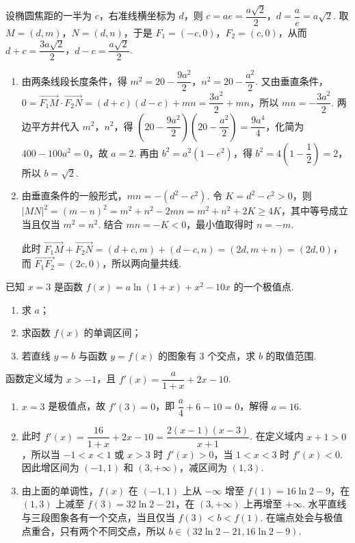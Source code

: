 \begin{solution}
设椭圆焦距的一半为 \(c\)，右准线横坐标为 \(d\)，则 \(c=ae=\dfrac{a\sqrt2}{2}\)，\(d=\dfrac ae=a\sqrt2\). 取 \(M=(d,m)\)，\(N=(d,n)\)，于是 \(F_1=(-c,0)\)，\(F_2=(c,0)\)，从而 \(d+c=\dfrac{3a\sqrt2}{2}\)，\(d-c=\dfrac{a\sqrt2}{2}\).

\begin{enumerate}
\item 由两条线段长度条件，得 \(m^2=20-\dfrac{9a^2}{2}\)，\(n^2=20-\dfrac{a^2}{2}\). 又由垂直条件，
\(0=\overrightarrow{F_1M}\cdot\overrightarrow{F_2N}=(d+c)(d-c)+mn=\dfrac{3a^2}{2}+mn\)，所以 \(mn=-\dfrac{3a^2}{2}\). 两边平方并代入 \(m^2\)，\(n^2\)，得
\(\left(20-\dfrac{9a^2}{2}\right)\left(20-\dfrac{a^2}{2}\right)=\dfrac{9a^4}{4}\)，化简为 \(400-100a^2=0\)，故 \(a=2\). 再由 \(b^2=a^2(1-e^2)\)，得 \(b^2=4\left(1-\dfrac12\right)=2\)，所以 \(b=\sqrt2\).
\item 由垂直条件的一般形式，\(mn=-(d^2-c^2)\). 令 \(K=d^2-c^2>0\)，则
\(\lvert MN\rvert^2=(m-n)^2=m^2+n^2-2mn=m^2+n^2+2K\geqslant4K\)，其中等号成立当且仅当 \(m^2=n^2\). 结合 \(mn=-K<0\)，最小值取得时 \(n=-m\).

此时 \(\overrightarrow{F_1M}+\overrightarrow{F_2N}=(d+c,m)+(d-c,n)=(2d,m+n)=(2d,0)\)，而 \(\overrightarrow{F_1F_2}=(2c,0)\)，所以两向量共线.
\end{enumerate}
\end{solution}

\begin{problem}
已知 \(x=3\) 是函数 \(f(x)=a\ln(1+x)+x^2-10x\) 的一个极值点.

\begin{enumerate}
\item 求 \(a\)；
\item 求函数 \(f(x)\) 的单调区间；
\item 若直线 \(y=b\) 与函数 \(y=f(x)\) 的图象有 \(3\) 个交点，求 \(b\) 的取值范围.
\end{enumerate}
\end{problem}

\begin{solution}
函数定义域为 \(x>-1\)，且 \(f'(x)=\dfrac{a}{1+x}+2x-10\).

\begin{enumerate}
\item \(x=3\) 是极值点，故 \(f'(3)=0\)，即 \(\dfrac a4+6-10=0\)，解得 \(a=16\).
\item 此时 \(f'(x)=\dfrac{16}{1+x}+2x-10=\dfrac{2(x-1)(x-3)}{x+1}\). 在定义域内 \(x+1>0\)，所以当 \(-1<x<1\) 或 \(x>3\) 时 \(f'(x)>0\)，当 \(1<x<3\) 时 \(f'(x)<0\). 因此增区间为 \((-1,1)\) 和 \((3,+\infty)\)，减区间为 \((1,3)\).
\item 由上面的单调性，\(f(x)\) 在 \((-1,1)\) 上从 \(-\infty\) 增至 \(f(1)=16\ln2-9\)，在 \((1,3)\) 上减至 \(f(3)=32\ln2-21\)，在 \((3,+\infty)\) 上再增至 \(+\infty\). 水平直线与三段图象各有一个交点，当且仅当 \(f(3)<b<f(1)\). 在端点处会与极值点重合，只有两个不同交点，所以 \(b\in(32\ln2-21,16\ln2-9)\).
\end{enumerate}
\end{solution}

